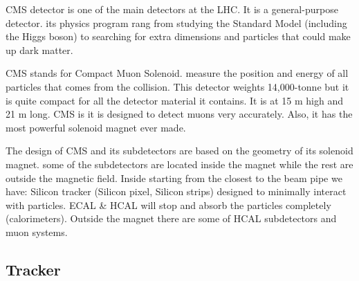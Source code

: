 %
%

CMS detector is one of the main detectors at the LHC. It is a general-purpose detector. its physics program rang from studying the Standard Model (including the Higgs boson) to searching for extra dimensions and particles that could make up dark matter.  

CMS stands for Compact Muon Solenoid. measure the position and energy of all particles that comes from the collision. This detector weights 14,000-tonne but it is quite compact for all the detector material it contains. It is at 15 m high and 21 m long. CMS is it is designed to detect muons very accurately. Also, it has the most powerful solenoid magnet ever made.  

The design of CMS and its subdetectors are based on the geometry of its solenoid magnet. some of the subdetectors are located inside the magnet while the rest are outside the magnetic field. Inside starting from the closest to the beam pipe we have: Silicon tracker (Silicon pixel, Silicon strips) designed to minimally interact with particles. ECAL & HCAL will stop and absorb the particles completely (calorimeters).  Outside the magnet there are some of HCAL subdetectors and muon systems. 

\subsection{Tracker}

